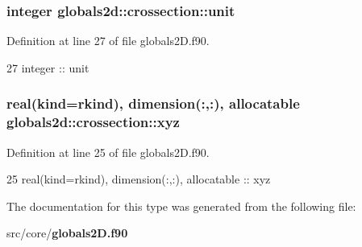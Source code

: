 \subsubsection[{unit}]{\setlength{\rightskip}{0pt plus 5cm}integer globals2d\+::crossection\+::unit}\label{structglobals2d_1_1crossection_a915d9242a336a991088854a2e6bac5db}


Definition at line 27 of file globals2\+D.\+f90.


\begin{DoxyCode}
27     \textcolor{keywordtype}{integer} :: unit
\end{DoxyCode}
\subsubsection[{xyz}]{\setlength{\rightskip}{0pt plus 5cm}real(kind=rkind), dimension(\+:,\+:), allocatable globals2d\+::crossection\+::xyz}\label{structglobals2d_1_1crossection_a9c365c0d36920393a4c98cb8db929dd9}


Definition at line 25 of file globals2\+D.\+f90.


\begin{DoxyCode}
25     \textcolor{keywordtype}{real(kind=rkind)}, \textcolor{keywordtype}{dimension(:,:)}, \textcolor{keywordtype}{allocatable} :: xyz
\end{DoxyCode}


The documentation for this type was generated from the following file\+:\begin{DoxyCompactItemize}
\item 
src/core/{\bf globals2\+D.\+f90}\end{DoxyCompactItemize}
